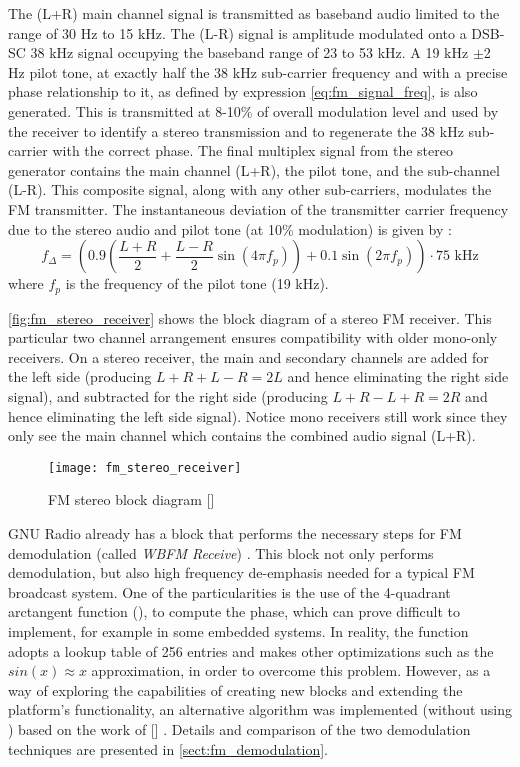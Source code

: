 The (L+R) main channel signal is transmitted as baseband audio limited to the range of 30 Hz to 15 kHz. The (L-R) signal is amplitude modulated onto a DSB-SC 38 kHz signal occupying the baseband range of 23 to 53 kHz. A 19 kHz $\pm$2 Hz pilot tone, at exactly half the 38 kHz sub-carrier frequency and with a precise phase relationship to it, as defined by expression \eqref{eq:fm_signal_freq}, is also generated. This is transmitted at 8-10\% of overall modulation level and used by the receiver to identify a stereo transmission and to regenerate the 38 kHz sub-carrier with the correct phase. The final multiplex signal from the stereo generator contains the main channel (L+R), the pilot tone, and the sub-channel (L-R). This composite signal, along with any other sub-carriers, modulates the FM transmitter. The instantaneous deviation of the transmitter carrier frequency due to the stereo audio and pilot tone (at 10\% modulation) is given by \cite{fm_demod}:
\begin{equation} \label{eq:fm_signal_freq}
  f_\Delta = \left(0.9\left(\frac{L+R}{2}+\frac{L-R}{2}\sin(4\pi f_p)\right)+0.1\sin(2\pi f_p)\right)\cdot 75 \text{ kHz}
\end{equation}
where $f_p$ is the frequency of the pilot tone (19 kHz).

\autoref{fig:fm_stereo_receiver} shows the block diagram of a stereo FM receiver. This particular two channel arrangement ensures compatibility with older mono-only receivers. On a stereo receiver, the main and secondary channels are added for the left side (producing $L+R+L-R=2L$ and hence eliminating the right side signal), and subtracted for the right side (producing $L+R-L+R=2R$ and hence eliminating the left side signal). Notice mono receivers still work since they only see the main channel which contains the combined audio signal (L+R).

\begin{figure}[H]
  \centering
  \texttt{[image: fm\_stereo\_receiver]}
  \caption{FM stereo block diagram [\citeauthor{HOOD199857}]}
  \label{fig:fm_stereo_receiver}
\end{figure}

GNU Radio already has a block that performs the necessary steps for FM demodulation (called \emph{WBFM Receive}) \cite{gnuradio_wbfm_receiver}. This block not only performs demodulation, but also high frequency de-emphasis needed for a typical FM broadcast system. One of the particularities is the use of the 4-quadrant arctangent function (), to compute the phase, which can prove difficult to implement, for example in some embedded systems. In reality, the function adopts a lookup table of 256 entries and makes other optimizations such as the $sin(x) \approx x$ approximation, in order to overcome this problem. However, as a way of exploring the capabilities of creating new blocks and extending the platform's functionality, an alternative algorithm was implemented (without using ) based on the work of [\citeauthor{lyons2004}] \cite{wbfm_alt_receiver}. Details and comparison of the two demodulation techniques are presented in \autoref{sect:fm_demodulation}.


